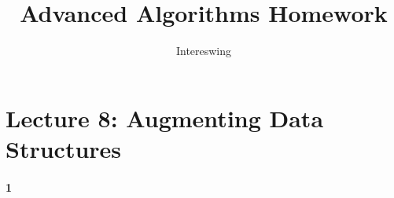 \documentclass{article}
\title{Advanced Algorithms Homework}
\author{Intereswing}
\begin{document}
\maketitle

\section{Lecture 8: Augmenting Data Structures}
\paragraph{1}
\end{document}

